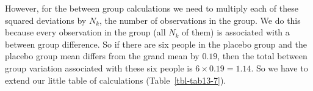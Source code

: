 \documentclass[
  a4paper,
]{book}
\begin{document}
However, for the between group calculations we need to multiply each of
these squared deviations by \(N_k\), the number of observations in the
group. We do this because every observation in the group (all \(N_k\) of
them) is associated with a between group difference. So if there are six
people in the placebo group and the placebo group mean differs from the
grand mean by \(0.19\), then the total between group variation
associated with these six people is \(6 \times 0.19 = 1.14\). So we have
to extend our little table of calculations (Table~\ref{tbl-tab13-7}).

\hypertarget{tbl-tab13-7}{}
 
  \providecommand{\huxb}[2]{\arrayrulecolor[RGB]{#1}\global\arrayrulewidth=#2pt}
  \providecommand{\huxvb}[2]{\color[RGB]{#1}\vrule width #2pt}
  \providecommand{\huxtpad}[1]{\rule{0pt}{#1}}
  \providecommand{\huxbpad}[1]{\rule[-#1]{0pt}{#1}}
\end{document}
